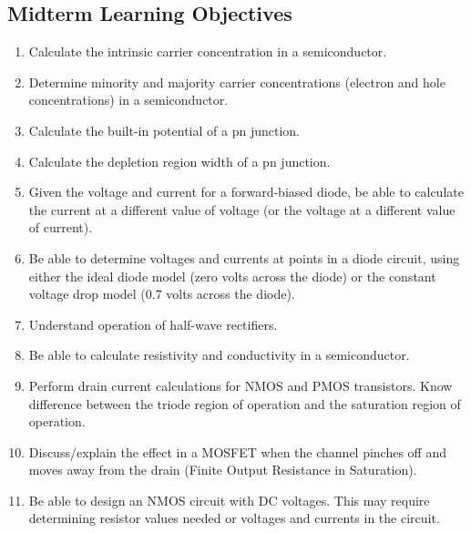 \documentclass[10pt]{article}
\begin{document}
\begin{multicols}{2}
\section*{Midterm Learning Objectives}
\begin{enumerate}[itemsep=0pt]
    \item Calculate the intrinsic carrier concentration in a semiconductor.
    \item Determine minority and majority carrier concentrations (electron and hole concentrations) in a semiconductor.
    \item Calculate the built-in potential of a pn junction.
    \item Calculate the depletion region width of a pn junction.
    \item Given the voltage and current for a forward-biased diode, be able to calculate the current at a different value of voltage (or the voltage at a different value of current).
    \item Be able to determine voltages and currents at points in a diode circuit, using either the ideal diode model (zero volts across the diode) or the constant voltage drop model (0.7 volts across the diode).
    \item Understand operation of half-wave rectifiers.
    \item Be able to calculate resistivity and conductivity in a semiconductor.
    \item Perform drain current calculations for NMOS and PMOS transistors. Know difference between the triode region of operation and the saturation region of operation.
    \item Discuss/explain the effect in a MOSFET when the channel pinches off and moves away from the drain (Finite Output Resistance in Saturation).
    \item Be able to design an NMOS circuit with DC voltages. This may require determining resistor values needed or voltages and currents in the circuit.
\end{enumerate}

\end{multicols}
\end{document}
